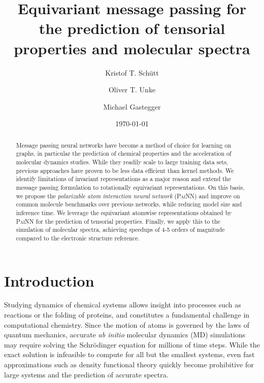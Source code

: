 \documentclass[reprint,
amsmath,amssymb,
 aip,jcp
]{revtex4-2}
\newcommand{\painn}{\textsc{PaiNN}}
\begin{document}
\title{Equivariant message passing for the prediction of tensorial properties and molecular spectra}

\author{Kristof T. Sch\"utt}
\author{Oliver T. Unke}
\author{Michael Gastegger}


\date{\today}


\begin{abstract}
Message passing neural networks have become a method of choice for learning on graphs, in particular the prediction of chemical properties and the acceleration of molecular dynamics studies.
While they readily scale to large training data sets, previous approaches have proven to be less data efficient than kernel methods.
We identify limitations of invariant representations as a major reason and extend the message passing formulation to rotationally equivariant representations.
On this basis, we propose the \emph{polarizable atom interaction neural network} (\painn{}) and improve on common molecule benchmarks over previous networks, while reducing model size and inference time.
We leverage the equivariant atomwise representations obtained by \painn{} for the prediction of tensorial properties.
Finally, we apply this to the simulation of molecular spectra, achieving speedups of 4-5 orders of magnitude compared to the electronic structure reference.
\end{abstract}

\maketitle

\section{Introduction}
\label{sec:introduction}

Studying dynamics of chemical systems allows insight into processes such as reactions or the folding of proteins, and constitutes a fundamental challenge in computational chemistry.
Since the motion of atoms is governed by the laws of quantum mechanics, accurate \textit{ab initio} molecular dynamics (MD) simulations may require solving the Schrödinger equation for millions of time steps.
While the exact solution is infeasible to compute for all but the smallest systems, even fast approximations such as density functional theory quickly become prohibitive for large systems and the prediction of accurate spectra.
\end{document}
